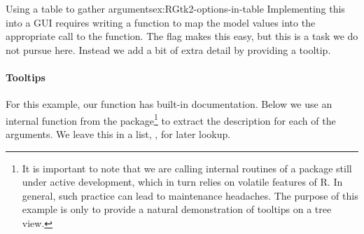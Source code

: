 \begin{example}{Using a table to gather arguments}{ex:RGtk2-options-in-table}
Implementing this into a GUI requires writing a function to map the
model values into the appropriate call to the  function. The
 flag makes this easy, but this is a task we do not pursue
here. Instead we add a bit of extra detail by providing a tooltip.

\paragraph{Tooltips}
For this example, our function has built-in documentation. Below we
use an internal function from the  package\footnote{It is
  important to note that we are calling internal routines of a package
  still under active development, which in turn relies on volatile
  features of R. In general, such practice can lead to maintenance
  headaches.  The purpose of this example is only to provide a natural
  demonstration of tooltips on a tree view.} to extract the
description for each of the arguments. We leave this in a list,
, for later lookup.
\begin{Schunk}
\end{Schunk}


\end{example}

